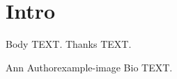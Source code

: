 \documentclass[twocolumn,letterpaper]{IEEEAerospaceCLS}
\begin{document}
\section{Intro}
Body TEXT.
\acknowledgements
Thanks TEXT.
\thebiography
\begin{biographywithpic}{Ann Author}{example-image}
Bio TEXT.
\end{biographywithpic}
\end{document}
